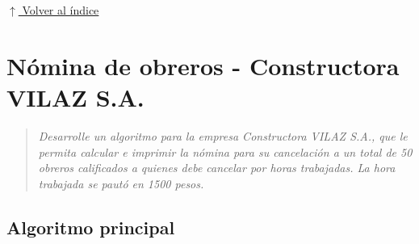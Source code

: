 \documentclass[12pt]{article}
\newcommand{\pseudocodigo}[2]{%
}
\newcommand{\volverindice}{%
    \vspace{1em}%
    \begin{flushright}%
        \hyperlink{indice}{\small $\uparrow$ Volver al índice}%
    \end{flushright}%
}
\newcommand{\enunciado}[1]{%
    \begin{quote}
        \itshape #1
    \end{quote}
}
\begin{document}



\volverindice
\newpage


\section{Nómina de obreros - Constructora VILAZ S.A.}

\enunciado{Desarrolle un algoritmo para la empresa Constructora VILAZ S.A., que le permita calcular e imprimir la nómina para su cancelación a un total de 50 obreros calificados a quienes debe cancelar por horas trabajadas. La hora trabajada se pautó en 1500 pesos.}

\subsection{Algoritmo principal}

\pseudocodigo{ej13_nomina_obreros}{Nómina de 50 obreros}







\end{document}
